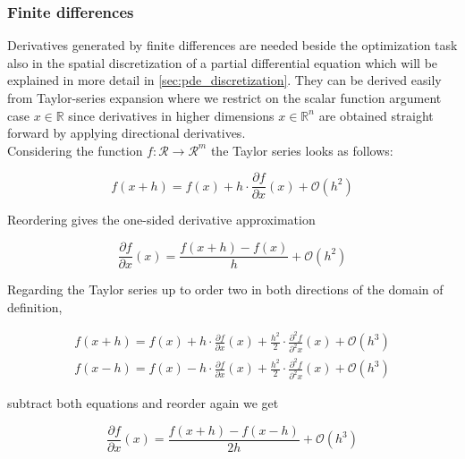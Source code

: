 \documentclass{scrartcl}[12pt, halfparskip]
\numberwithin{equation}{section}
\numberwithin{figure}{section}
\numberwithin{table}{section}
\begin{document}
\subsubsection{Finite differences}
\label{sec:finite_differences}
Derivatives generated by finite differences are needed beside the optimization task also in the spatial discretization of a partial differential equation which will be explained in more detail in \cref{sec:pde_discretization}.
They can be derived easily from Taylor-series expansion where we restrict on the scalar function argument case $x \in \mathbb{R}$ since derivatives in higher dimensions $x \in \mathbb{R}^n$ are obtained straight forward by applying directional derivatives. \\
Considering the function $f: \mathcal{R} \rightarrow \mathcal{R}^m$ the Taylor series looks as follows:


\begin{equation}
f(x+h) = f(x) + h \cdot \frac{\partial f}{\partial x}(x) + \mathcal{O}(h^2)
\end{equation}

Reordering gives the one-sided derivative approximation

\begin{equation}
\frac{\partial f}{\partial x}(x) = \frac{f(x+h) - f(x)}{h} + \mathcal{O}(h^2)
\end{equation}

Regarding the Taylor series up to order two in both directions of the domain of definition,

\begin{subequations}
	\label{eq:finite_differences_taylor_exp}
	\begin{align}
	f(x+h) = f(x) + h \cdot \frac{\partial f}{\partial x}(x) + \frac{h^2}{2} \cdot \frac{\partial^2 f}{\partial^2 x}(x) + \mathcal{O}(h^3) \label{eq:finite_differences_taylor_exp_+} \\
	f(x-h) = f(x) - h \cdot \frac{\partial f}{\partial x}(x) + \frac{h^2}{2} \cdot \frac{\partial^2 f}{\partial^2 x}(x) + \mathcal{O}(h^3)  \label{eq:finite_differences_taylor_exp_-}	
	\end{align}
\end{subequations}


subtract both equations and reorder again we get

\begin{equation}
\frac{\partial f}{\partial x}(x) = \frac{f(x+h) - f(x-h)}{2 h} + \mathcal{O}(h^3)
\end{equation}
\end{document}
